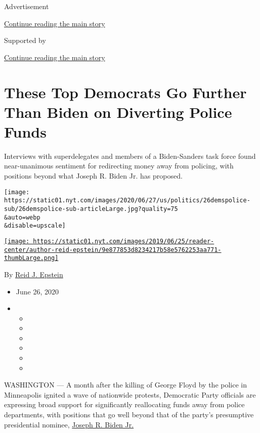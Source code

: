 Advertisement

\protect\hyperlink{after-top}{Continue reading the main story}

Supported by

\protect\hyperlink{after-sponsor}{Continue reading the main story}

\hypertarget{these-top-democrats-go-further-than-biden-on-diverting-police-funds}{%
\section{These Top Democrats Go Further Than Biden on Diverting Police
Funds}\label{these-top-democrats-go-further-than-biden-on-diverting-police-funds}}

Interviews with superdelegates and members of a Biden-Sanders task force
found near-unanimous sentiment for redirecting money away from policing,
with positions beyond what Joseph R. Biden Jr. has proposed.

\texttt{[image: https://static01.nyt.com/images/2020/06/27/us/politics/26demspolice-sub/26demspolice-sub-articleLarge.jpg?quality=75\\\&auto=webp\\\&disable=upscale]}

\href{https://www.nytimes.com/by/reid-j-epstein}{\texttt{[image: https://static01.nyt.com/images/2019/06/25/reader-center/author-reid-epstein/9e877853d8234217b58e5762253aa771-thumbLarge.png]}}

By \href{https://www.nytimes.com/by/reid-j-epstein}{Reid J. Epstein}

\begin{itemize}
\item
  June 26, 2020
\item
  \begin{itemize}
  \item
  \item
  \item
  \item
  \item
  \item
  \end{itemize}
\end{itemize}

WASHINGTON --- A month after the killing of George Floyd by the police
in Minneapolis ignited a wave of nationwide protests, Democratic Party
officials are expressing broad support for significantly reallocating
funds away from police departments, with positions that go well beyond
that of the party's presumptive presidential nominee,
\href{https://www.nytimes.com/interactive/2020/us/elections/joe-biden.html}{Joseph
R. Biden Jr.}

